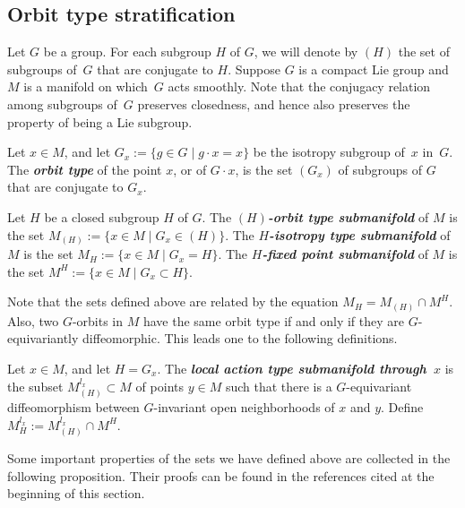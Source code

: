 \documentclass[11pt]{article}
\numberwithin{equation}{section}
\newcommand{\deff}[1]{\textbf{\emph{#1}}}
\begin{document}
\subsection{Orbit type stratif\/ication}

Let $G$ be a group.  For each subgroup $H$ of $G$, we will denote by $(H)$ the set of subgroups of~$G$ that are conjugate to $H$.  Suppose $G$ is a compact Lie group and $M$ is a manifold on which~$G$ acts smoothly.  Note that the conjugacy relation among subgroups of~$G$ preserves closedness, and hence also preserves the property of being a Lie subgroup.

\begin{Definition}
Let $x \in M$, and let $G_x := \{ g \in G \mid g \cdot x = x \}$ be the isotropy subgroup of~$x$ in~$G$.  The \deff{orbit type} of the point $x$, or of $G \cdot x$, is the set $(G_x)$ of subgroups of $G$ that are conjugate to $G_x$.

Let $H$ be a closed subgroup $H$ of $G$.  The \deff{$(H)$-orbit type submanifold} of $M$ is the set $M_{(H)} := \{ x \in M \mid G_x \in (H) \}$.  The \deff{$H$-isotropy type submanifold} of $M$ is the set $M_H := \{ x \in M \mid G_x = H \}$.  The \deff{$H$-fixed point submanifold} of $M$ is the set $M^H := \{ x \in M \mid G_x \subset H \}$.
\end{Definition}

Note that the sets def\/ined above are related by the equation $M_H = M_{(H)} \cap M^H$.
Also, two $G$-orbits in $M$ have the same orbit type if and only if they are $G$-equivariantly dif\/feomorphic.  This leads one to the following def\/initions.


\begin{Definition}
Let $x \in M$, and let $H = G_x$.  The \deff{local action type submanifold through~$x$} is the subset $M_{(H)}^{l_x} \subset M$ of points $y \in M$ such that there is a $G$-equivariant dif\/feomorphism between $G$-invariant open neighborhoods of $x$ and $y$.  Def\/ine $M_H^{l_x} := M_{(H)}^{l_x} \cap M^H$.
\end{Definition}


Some important properties of the sets we have def\/ined above are collected in the following proposition.  Their proofs can be found in the references cited at the beginning of this section.
\end{document}
